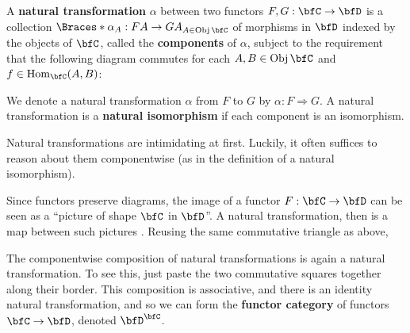 \documentclass[a5paper]{article}
\begin{document}
\begin{definition*}
	A \textbf{natural transformation} $\alpha$ between two functors
  $F,G:\bfC\to\bfD$ is a collection $\braces{\alpha_A:FA\to GA}_{A\in \Obj\bfC}$
  of morphisms in $\bfD$ indexed by the objects of $\bfC$, called the
  \textbf{components} of $\alpha$, subject to the requirement that the following
  diagram commutes for each $A,B\in\Obj \bfC$ and $f\in\Hom_{\bfC}(A,B)$:
  \begin{center}
  \end{center}
  \noindent We denote a natural transformation $\alpha$ from $F$ to $G$ by
  $\alpha: F\Rightarrow G$. A natural transformation is a
  \textbf{natural isomorphism} if each component is an isomorphism.
\end{definition*}

Natural transformations are intimidating at first. Luckily, it often suffices to
reason about them componentwise (as in the definition of a natural isomorphism).

Since functors preserve diagrams, the image of a functor $F:\bfC\to\bfD$ can be
seen as a ``picture of shape $\bfC$ in $\bfD$''. A natural transformation, then
is a map between such pictures \cite[pp.\ 16]{maclane}. Reusing the same
commutative triangle as above,

\begin{center}
\end{center}

\begin{definition*}
	The componentwise composition of natural transformations is again a natural
  transformation. To see this, just paste the two commutative squares together
  along their border. This composition is associative, and there is an identity
  natural transformation, and so we can form the \textbf{functor category} of
  functors $\bfC\to\bfD$, denoted $\bfD^{\bfC}$.
\end{definition*}
\end{document}
